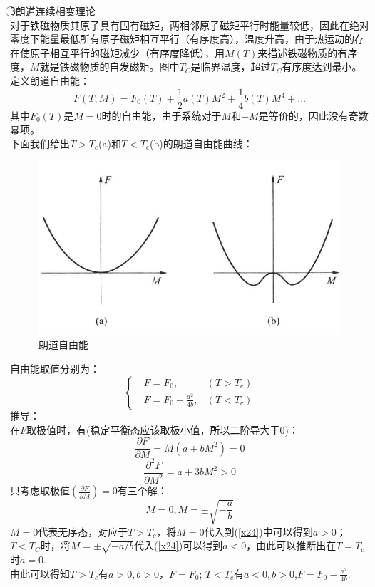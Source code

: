 \documentclass[12pt]{article}
\begin{document}
\textcircled{3}朗道连续相变理论\\
对于铁磁物质其原子具有固有磁矩，两相邻原子磁矩平行时能量较低，因此在绝对零度下能量最低所有原子磁矩相互平行（有序度高），温度升高，由于热运动的存在使原子相互平行的磁矩减少（有序度降低），用$M(T)$来描述铁磁物质的有序度，$M$就是铁磁物质的自发磁矩。图中$T_C$是临界温度，超过$T_C$有序度达到最小。\\
定义朗道自由能：
\begin{equation}
	F(T,M)=F_0(T)+\frac{1}{2}a(T)M^2+\frac{1}{4}b(T)M^4+...
\end{equation}
其中$F_0(T)$是$M=0$时的自由能，由于系统对于$M$和$-M$是等价的，因此没有奇数幂项。\\
下面我们给出$T>T_c$(a)和$T<T_c$(b)的朗道自由能曲线：
\begin{figure}[H]
	\centering
		\includegraphics[scale=0.3]{F13.png}
		\caption{朗道自由能}
\end{figure}
自由能取值分别为：
\begin{equation}
	\left\{\begin{split}
	&F=F_0,&(T>T_c)	\\
	&F=F_0-\frac{a^2}{4b},&(T<T_c)
	\end{split}\right.
\end{equation}
推导：\\
在$F$取极值时，有(稳定平衡态应该取极小值，所以二阶导大于0)：
\begin{equation}
		\frac{\partial F}{\partial M}=M(a+bM^2)=0
	\end{equation}
\begin{equation}
		\frac{\partial^2 F}{\partial M^2}=a+3bM^2>0
		\label{x24}
\end{equation}
只考虑取极值$(\frac{\partial F}{\partial M})=0$有三个解：
\begin{equation}
	M=0,M=\pm \sqrt{-\frac{a}{b}}
\end{equation}
$M=0$代表无序态，对应于$T>T_c$，将$M=0$代入到(\ref{x24})中可以得到$a>0$；$T<T_C$时，将$M=\pm \sqrt{-a/b}$代入(\ref{x24})可以得到$a<0$，由此可以推断出在$T=T_c$时$a=0$.\\
由此可以得知$T>T_c$有$a>0,b>0$，$F=F_0$; $T<T_c$有$a<0,b>0$,$F=F_0-\frac{a^2}{4b}$.
\end{document}
